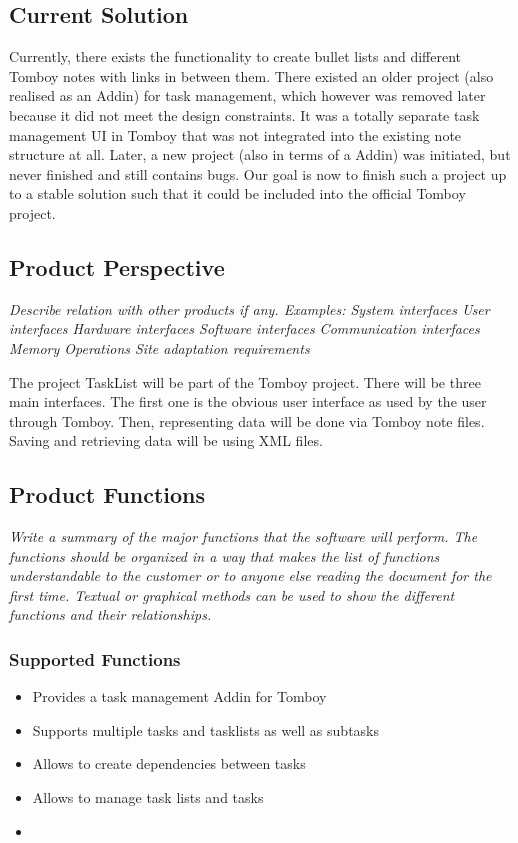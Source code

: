 \subsection{Current Solution}
\label{description:solution}

Currently, there exists the functionality to create bullet lists and different Tomboy notes with links in between them.
There existed an older project (also realised as an Addin) for task management, which however was removed later because it did not meet the design constraints. It was a totally separate task management UI in Tomboy that was not integrated
into the existing note structure at all. Later, a new project (also in terms of a Addin) was initiated, but never finished and still contains bugs.
Our goal is now to finish such a project up to a stable solution such that it could be included into the official Tomboy project.

\subsection{Product Perspective}
\label{description:perspective}
\textit{
Describe relation with other products if any. Examples:
System interfaces
User interfaces
Hardware interfaces
Software interfaces
Communication interfaces
Memory
Operations
Site adaptation requirements}

The project TaskList will be part of the Tomboy project. There will be three main interfaces. The first one is the obvious user interface as used by the user through Tomboy. Then, representing data will be done via Tomboy note files. Saving and retrieving data will be using XML files. 

\subsection{Product Functions}
\label{description:functions}
\textit{
Write a summary of the major functions that the software will perform. The functions should be organized in a way that makes the list of functions understandable to the customer or to anyone else reading the document for the first time. Textual or graphical methods can be used to show the different functions and their relationships.
}
	\subsubsection*{Supported Functions}
	\label{description:functions:supported}
	\begin{itemize}
		\item Provides a task management Addin for Tomboy
                \item Supports multiple tasks and tasklists as well as subtasks
                \item Allows to create dependencies between tasks
                \item Allows to manage task lists and tasks
                \item 
	\end{itemize}

